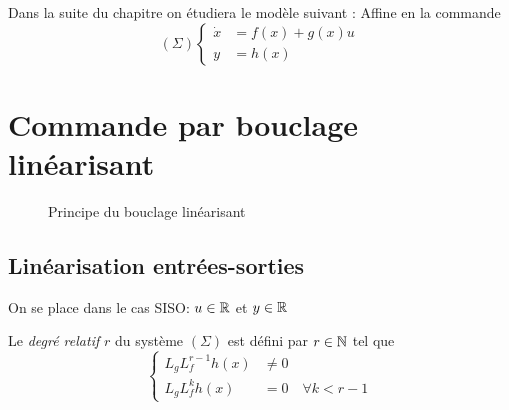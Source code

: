 \documentclass[main.tex]{subfiles}
\begin{document}
Dans la suite du chapitre on étudiera le modèle suivant : Affine en la commande
\[(\Sigma)
    \begin{cases}
      \dot{x} & = f(x) + g(x) u\\
      y & = h(x)
    \end{cases}
 \]\nopagebreak
\section{Commande par bouclage linéarisant}
\begin{figure}[H]
  \centering
  \caption{Principe du bouclage linéarisant}
\end{figure}
\subsection{Linéarisation entrées-sorties}
On se place dans le cas SISO: $u\in \mathbb{R}$ et $y\in\mathbb{R}$

\begin{defin}
  Le\emph{ degré relatif} $r$ du système $(\Sigma)$ est défini par $r \in \mathbb{N}$ tel que
  \[
    \begin{cases}

  L_gL_f^{r-1}h(x) &\neq 0\\
  L_gL_f^{k}h(x) &= 0 \quad \forall k < r-1
\end{cases}
\]
\end{defin}
\end{document}
